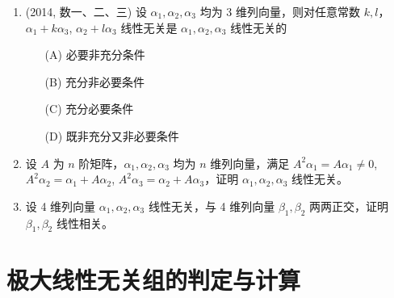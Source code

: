 \documentclass[12pt, a4paper, oneside, UTF8]{ctexbook}
\begin{document}
\begin{enumerate}[label=\arabic*.,start=4]
    \item (2014, 数一、二、三) 设 $\alpha_1, \alpha_2, \alpha_3$ 均为 3 维列向量，则对任意常数 $k, l$，$\alpha_1 + k\alpha_3$, $\alpha_2 + l\alpha_3$ 线性无关是 $\alpha_1, \alpha_2, \alpha_3$ 线性无关的
    \begin{enumerate}
        \item [(A)] 必要非充分条件
        \item [(B)] 充分非必要条件
        \item [(C)] 充分必要条件
        \item [(D)] 既非充分又非必要条件
    \end{enumerate}
    
    \begin{solution}
    \newpage
    \end{solution}
    
    \item 设 $A$ 为 $n$ 阶矩阵，$\alpha_1, \alpha_2, \alpha_3$ 均为 $n$ 维列向量，满足 $A^2\alpha_1 = A\alpha_1 \neq 0$, $A^2\alpha_2 = \alpha_1 + A\alpha_2$,
    $A^2\alpha_3 = \alpha_2 + A\alpha_3$，证明 $\alpha_1, \alpha_2, \alpha_3$ 线性无关。
    
    \begin{solution}
    \newpage
    \end{solution}
    
    \item 设 4 维列向量 $\alpha_1, \alpha_2, \alpha_3$ 线性无关，与 4 维列向量 $\beta_1, \beta_2$ 两两正交，证明 $\beta_1, \beta_2$ 线性相关。
    
    \begin{solution}
    \newpage
    \end{solution}
\end{enumerate}

\section{极大线性无关组的判定与计算}
\end{document}
